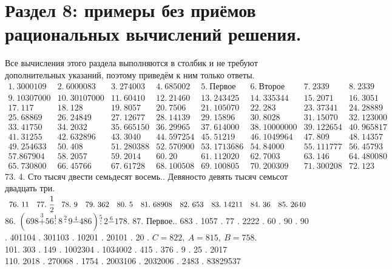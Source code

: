 \section{Раздел 8: примеры без приёмов рациональных вычислений решения.}
Все вычисления этого раздела выполняются в столбик и не требуют дополнительных указаний, поэтому приведём к ним только ответы.
$\begin{array}{lllllllllll}
1.\ 3000109& 2.\ 6000083& 3.\ 274003& 4.\ 685002& 5.\ \text{Первое}& 6.\ \text{Второе}& 7.\ 2339& 8.\ 2339\\ 9.\ 10307000&
10.\ 30107000& 11.\ 60410& 12.\ 21460& 13.\ 243425& 14.\ 335344& 15.\ 2071&
16.\ 3051\\ 17.\ 117& 18.\ 128&
19.\ 8057& 20.\ 7506& 21.\ 105070& 22.\ 283& 23.\ 37341& 24.\ 28889\\
25.\ 68869& 26.\ 24849& 27.\ 12677& 28.\ 14139& 29.\ 15896& 30.\ 8028&
31.\ 15070& 32.\ 123000\\
33.\ 41750& 34.\ 2032& 35.\ 665150& 36.\ 29965& 37.\ 614000& 38.\ 10000000&
39.\ 122654& 40.\ 965817\\ 41.\ 31255& 42.\ 632896& 43.\ 3040& 44.\ 597254&
45.\ 51219& 46.\ 1049964& 47.\ 809& 48.\ 14357\\
49.\ 254633& 50.\ 408& 51.\ 280388& 52.\ 570900& 53.\ 1713686& 54.\ 84000&
55.\ 111777& 56.\ 45793\\ 57. 867904& 58.\ 2057& 59.\ 2014& 60.\ 20&
61.\ 112020& 62.\ 7003& 63.\ 146& 64.\ 480080\\
65.\ 730800& 66.\ 45766& 67.\ 61728& 68.\ 100508& 69.\ 100805& 70.\ 200309&
71.\ 300208& 72.\ 123 \end{array}$\\
73. 4. Сто тысяч двести семьдесят восемь.. Девяносто девять тысяч семьсот двадцать три.\\
$\begin{array}{lllllllllllll}
76.\ 11& 77.\ \cfrac{1}{2}& 78.\ 9 &79.\ 362& 80.\ 5& 81.\ 68908&
82.\ 653& 83.\ 14211&
84.\ 36& 85.\ 2640
\end{array}$\\
86. $(698\stackrel{3}{+}56\stackrel{1}{:}8\stackrel{2}{\cdot}9\stackrel{4}{-}486)\stackrel{5}{:}2\stackrel{6}{-}178.$
87. Первое.. 683 . 1057 . 77 . 2222 . 60 . 90 . 90 . 401104 . 301103 . 10201 . 20101 . 20 . $C=822,\ A=815,\ B=758.$ \\ 101. 303 . 149 . 1002304 . 1034002 . 415 . 376 . 9 . 25 . 2017 \\ 110. 2018 . 270068 . 1754 . 2003106 . 2032006 . 2483 . 83829537\\
